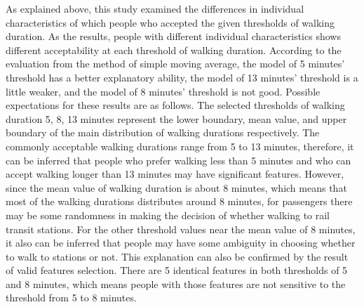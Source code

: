 \documentclass[Journal,letterpaper]{ascelike-new}
\begin{document}
%
As explained above, this study examined the differences in individual characteristics of which people who accepted the given thresholds of walking duration. As the results, people with different individual characteristics shows different acceptability at each threshold of walking duration. According to the evaluation from the method of simple moving average, the model of 5 minutes’ threshold has a better explanatory ability, the model of 13 minutes' threshold is a little weaker, and the model of 8 minutes' threshold is not good. Possible expectations for these results are as follows. The selected thresholds of walking duration 5, 8, 13 minutes represent the lower boundary, mean value, and upper boundary of the main distribution of walking durations respectively. The commonly acceptable walking durations range from 5 to 13 minutes, therefore, it can be inferred that people who prefer walking less than 5 minutes and who can accept walking longer than 13 minutes may have significant features. However, since the mean value of walking duration is about 8 minutes, which means that most of the walking durations distributes around 8 minutes, for passengers there may be some randomness in making the decision of whether walking to rail transit stations. For the other threshold values near the mean value of 8 minutes, it also can be inferred that people may have some ambiguity in choosing whether to walk to stations or not. This explanation can also be confirmed by the result of valid features selection. There are 5 identical features in both thresholds of 5 and 8 minutes, which means people with those features are not sensitive to the threshold from 5 to 8 minutes.
\end{document}
